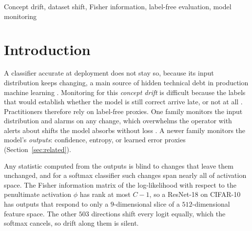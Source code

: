 \documentclass[conference]{IEEEtran}
\newcommand{\act}{\phi}
\begin{document}
\begin{IEEEkeywords}
Concept drift, dataset shift, Fisher information, label-free evaluation,
model monitoring
\end{IEEEkeywords}

\section{Introduction}
\label{sec:intro}

A classifier accurate at deployment does not stay so, because its input
distribution keeps changing, a main source of hidden technical debt in
production machine learning \cite{sculley2015debt}. Monitoring for this \emph{concept drift} is
difficult because the labels that would establish whether the model is still
correct arrive late, or not at all \cite{gama2014survey}.
Practitioners therefore rely on label-free proxies. One family monitors the
input distribution and alarms on any change, which overwhelms the operator
with alerts about shifts the model absorbs without loss
\cite{rabanser2019failing}. A newer family monitors the model's
\emph{outputs}: confidence, entropy, or learned error proxies
(Section~\ref{sec:related}).

Any statistic computed from the outputs is blind to changes that leave them
unchanged, and for a softmax classifier such changes span nearly all of
activation space. The Fisher information matrix of the log-likelihood with
respect to the penultimate activation $\act$ has rank at most $C-1$, so a
ResNet-18 on CIFAR-10 has outputs that respond to only a $9$-dimensional slice
of a $512$-dimensional feature space. The other $503$ directions shift every
logit equally, which the softmax cancels, so drift along them is silent.
\end{document}
